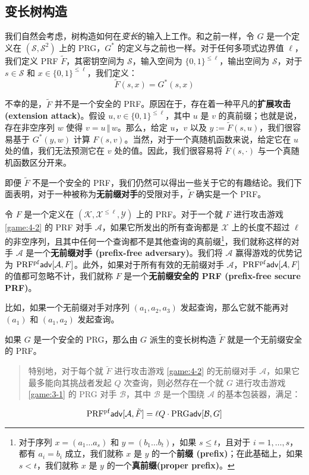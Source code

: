 \subsection{变长树构造}\label{subsec:4-6-1}

我们自然会考虑，树构造如何在\emph{变长}的输入上工作。和之前一样，令 $G$ 是一个定义在 $(\mathcal{S},\mathcal{S}^2)$ 上的 PRG，$G^*$ 的定义与之前也一样。对于任何多项式边界值 $\ell$，我们定义 PRF $\tilde F$，其密钥空间为 $\mathcal{S}$，输入空间为 $\{0,1\}^{\leq\ell}$，输出空间为 $\mathcal{S}$，对于 $s\in\mathcal{S}$ 和 $x\in\{0,1\}^{\leq\ell}$，我们定义：
\[
\tilde F(s,x)=G^*(s,x)
\]

不幸的是，$\tilde F$ 并不是一个安全的 PRF。原因在于，存在着一种平凡的\textbf{扩展攻击 (extension attack)}。假设 $u,v\in\{0,1\}^{\leq\ell}$，其中 $u$ 是 $v$ 的真前缀；也就是说，存在非空序列 $w$ 使得 $v=u\,\Vert\,w$。那么，给定 $u$，$v$ 以及 $y:=\tilde F(s,u)$，我们很容易基于 $G^*(y,w)$ 计算 $F(s,v)$。当然，对于一个真随机函数来说，给定它在 $u$ 处的值，我们无法预测它在 $v$ 处的值。因此，我们很容易将 $\tilde F(s,\cdot)$ 与一个真随机函数区分开来。

即便 $\tilde F$ 不是一个安全的 PRF，我们仍然可以得出一些关于它的有趣结论。我们下面表明，对于一种被称为\textbf{无前缀对手}的受限对手，$\tilde F$ 确实是一个 PRF。

\begin{definition}\label{def:4-5}
令 $F$ 是一个定义在 $(\mathcal{K},\mathcal{X}^{\leq\ell}, \mathcal{Y})$ 上的 PRF。对于一个就 $F$ 进行攻击游戏 \ref{game:4-2} 的 PRF 对手 $\mathcal{A}$，如果它所发出的所有查询都是 $\mathcal{X}$ 上的长度不超过 $\ell$ 的非空序列，且其中任何一个查询都不是其他查询的真前缀\footnote[3]{对于序列 $x=(a_1\dots a_s)$ 和 $y=(b_1\dots b_t)$，如果 $s\leq t$，且对于 $i=1,\dots,s$，都有 $a_i=b_i$ 成立，我们就称 $x$ 是 $y$ 的一个\textbf{前缀 (prefix)}；在此基础上，如果 $s<t$，我们就称 $x$ 是 $y$ 的一个\textbf{真前缀(proper prefix)}。}，我们就称这样的对手 $\mathcal{A}$ 是一个\textbf{无前缀对手 (prefix-free adversary)}。我们将 $\mathcal{A}$ 赢得游戏的优势记为 ${\rm PRF^{pf}\mathsf{adv}}[\mathcal{A},F]$。此外，如果对于所有有效的无前缀对手 $\mathcal{A}$，${\rm PRF^{pf}\mathsf{adv}}[\mathcal{A},F]$ 的值都可忽略不计，我们就称 $F$ 是一个\textbf{无前缀安全的 PRF (prefix-free secure PRF)}。
\end{definition}

比如，如果一个无前缀对手对序列 $(a_1,a_2,a_3)$ 发起查询，那么它就不能再对 $(a_1)$ 和 $(a_1,a_2)$ 发起查询。

\begin{theorem}\label{theo:4-11}
如果 $G$ 是一个安全的 PRG，那么由 $G$ 派生的变长树构造 $\tilde F$ 就是一个无前缀安全的 PRF。
\begin{quote}
特别地，对于每个就 $\tilde F$ 进行攻击游戏 \ref{game:4-2} 的无前缀对手 $\mathcal{A}$，如果它最多能向其挑战者发起 $Q$ 次查询，则必然存在一个就 $G$ 进行攻击游戏 \ref{game:3-1} 的 PRG 对手 $\mathcal{B}$，其中 $\mathcal{B}$ 是一个围绕 $\mathcal{A}$ 的基本包装器，满足：
\end{quote}
\[
{\rm PRF^{pf}\mathsf{adv}}[\mathcal{A},\tilde{F}]
=
\ell Q\cdot
{\rm PRG\mathsf{adv}}[\mathcal{B},G]
\]
\end{theorem}

